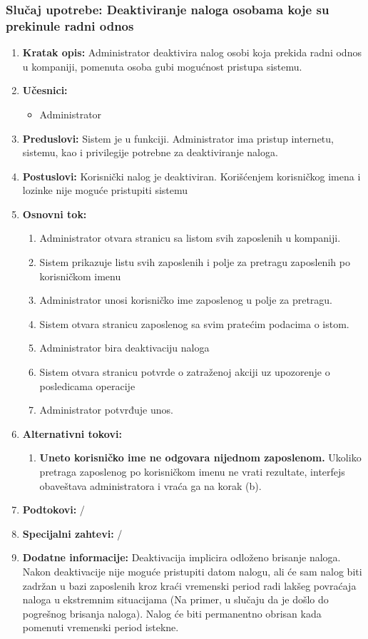 \documentclass[a4paper]{article}
\begin{document}
\subsubsection{Slučaj upotrebe: Deaktiviranje naloga osobama koje su prekinule radni odnos}
\begin{enumerate}
    \item \textbf{Kratak opis:} Administrator deaktivira nalog osobi koja prekida radni odnos u kompaniji, pomenuta osoba gubi mogućnost pristupa sistemu.
    \item \textbf{Učesnici:}
        \begin{itemize}
            \item Administrator
        \end{itemize}
    \item \textbf{Preduslovi:} Sistem je u funkciji. Administrator ima pristup internetu, sistemu, kao i privilegije potrebne za deaktiviranje naloga.
    \item \textbf{Postuslovi:} Korisnički nalog je deaktiviran. Korišćenjem korisničkog imena i lozinke nije moguće pristupiti sistemu
    \item \textbf{Osnovni tok:}
        \begin{enumerate}
            \item Administrator otvara stranicu sa listom svih zaposlenih u kompaniji.
            \item Sistem prikazuje listu svih zaposlenih i polje za pretragu zaposlenih po korisničkom imenu
            \item Administrator unosi korisničko ime zaposlenog u polje za pretragu.
            \item Sistem otvara stranicu zaposlenog sa svim pratećim podacima o istom.
            \item Administrator bira deaktivaciju naloga
            \item Sistem otvara stranicu potvrde o zatraženoj akciji uz upozorenje o posledicama operacije
            \item Administrator potvrđuje unos.
        \end{enumerate}
    \item \textbf{Alternativni tokovi:}
        \begin{enumerate}
            \item \textbf{Uneto korisničko ime ne odgovara nijednom zaposlenom.} Ukoliko pretraga zaposlenog po korisničkom imenu ne vrati rezultate, interfejs obaveštava administratora i vraća ga na korak (b).
        \end{enumerate}
    \item \textbf{Podtokovi:} /
    \item \textbf{Specijalni zahtevi:} /
    \item \textbf{Dodatne informacije:} Deaktivacija implicira odloženo brisanje naloga. Nakon deaktivacije nije moguće pristupiti datom nalogu, ali će sam nalog biti zadržan u bazi zaposlenih kroz kraći vremenski period radi lakšeg povraćaja naloga u ekstremnim situacijama (Na primer, u slučaju da je došlo do pogrešnog brisanja naloga). Nalog će biti permanentno obrisan kada pomenuti vremenski period istekne.
\end{enumerate}
\end{document}
